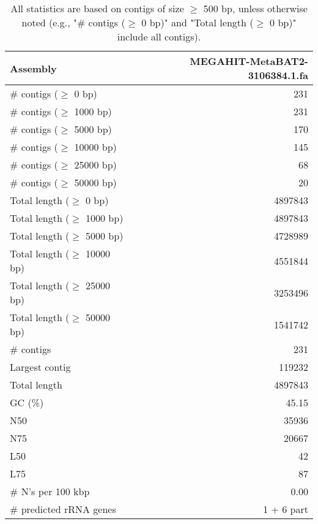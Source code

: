 \documentclass[12pt,a4paper]{article}
\begin{document}
\begin{table}[ht]
\begin{center}
\caption{All statistics are based on contigs of size $\geq$ 500 bp, unless otherwise noted (e.g., "\# contigs ($\geq$ 0 bp)" and "Total length ($\geq$ 0 bp)" include all contigs).}
\begin{tabular}{|l*{1}{|r}|}
\hline
Assembly & MEGAHIT-MetaBAT2-3106384.1.fa \\ \hline
\# contigs ($\geq$ 0 bp) & 231 \\ \hline
\# contigs ($\geq$ 1000 bp) & 231 \\ \hline
\# contigs ($\geq$ 5000 bp) & 170 \\ \hline
\# contigs ($\geq$ 10000 bp) & 145 \\ \hline
\# contigs ($\geq$ 25000 bp) & 68 \\ \hline
\# contigs ($\geq$ 50000 bp) & 20 \\ \hline
Total length ($\geq$ 0 bp) & 4897843 \\ \hline
Total length ($\geq$ 1000 bp) & 4897843 \\ \hline
Total length ($\geq$ 5000 bp) & 4728989 \\ \hline
Total length ($\geq$ 10000 bp) & 4551844 \\ \hline
Total length ($\geq$ 25000 bp) & 3253496 \\ \hline
Total length ($\geq$ 50000 bp) & 1541742 \\ \hline
\# contigs & 231 \\ \hline
Largest contig & 119232 \\ \hline
Total length & 4897843 \\ \hline
GC (\%) & 45.15 \\ \hline
N50 & 35936 \\ \hline
N75 & 20667 \\ \hline
L50 & 42 \\ \hline
L75 & 87 \\ \hline
\# N's per 100 kbp & 0.00 \\ \hline
\# predicted rRNA genes & 1 + 6 part \\ \hline
\end{tabular}
\end{center}
\end{table}
\end{document}
